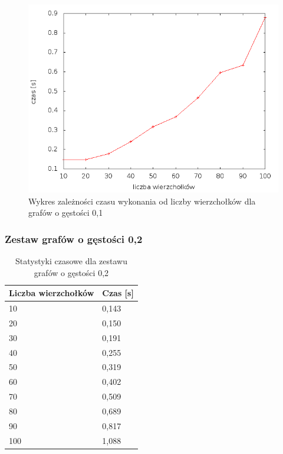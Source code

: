 \documentclass[12pt, a4paper]{article}
\begin{document}
\begin{figure}[h]
    \begin{center}
	\includegraphics[scale=0.5]{results/img/den/den_01.png}
	\caption{Wykres zależności czasu wykonania od liczby wierzchołków dla grafów o gęstości 0,1}
    \end{center}
\end{figure}

\subsubsection*{Zestaw grafów o gęstości 0,2}
\begin{table}[H]
\caption{Statystyki czasowe dla zestawu grafów o gęstości 0,2}
\begin{center}
    \begin{tabular}{|l|l|}
    \hline
    Liczba wierzchołków & Czas [s] \\ \hline
    10 & 0,143 \\ \hline
    20 & 0,150 \\ \hline
    30 & 0,191 \\ \hline
    40 & 0,255 \\ \hline
    50 & 0,319 \\ \hline
    60 & 0,402 \\ \hline
    70 & 0,509 \\ \hline
    80 & 0,689 \\ \hline
    90 & 0,817 \\ \hline
    100 & 1,088 \\ \hline
    \end{tabular}
\end{center}
\end{table}
\end{document}
